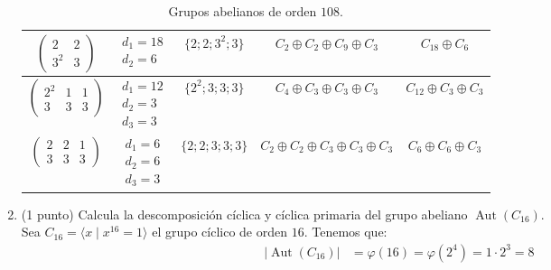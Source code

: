 \documentclass[12pt]{article}
\DeclareMathOperator{\Aut}{Aut}
\begin{document}
\begin{ejercicio}
\begin{enumerate}
\begin{table}[h]
\begin{tabular}{c|c|c|c|c}
                $\begin{pmatrix}
                    2 & 2\\
                    3^2 & 3
                \end{pmatrix}
                $ & $\begin{array}{l}
                    d_1=18 \\
                    d_2=6
                \end{array}$ & $\{2; 2; 3^2; 3\}$ & $C_2 \oplus C_2 \oplus C_9 \oplus C_3$ & $C_{18} \oplus C_6$ \\ \hline
                $\begin{pmatrix}
                    2^2 & 1 & 1\\
                    3 & 3 & 3
                \end{pmatrix}
                $ & $\begin{array}{l}
                    d_1=12 \\
                    d_2=3 \\
                    d_3=3
                \end{array}$ & $\{2^2; 3; 3; 3\}$ & $C_4 \oplus C_3 \oplus C_3 \oplus C_3$ & $C_{12} \oplus C_3 \oplus C_3$ \\ \hline
                $\begin{pmatrix}
                    2 & 2 & 1\\
                    3 & 3 & 3
                \end{pmatrix}
                $ & $\begin{array}{l}
                    d_1=6 \\
                    d_2=6 \\
                    d_3=3
                \end{array}$ & $\{2; 2; 3; 3; 3\}$ & $C_2 \oplus C_2 \oplus C_3 \oplus C_3 \oplus C_3$ & $C_6 \oplus C_6 \oplus C_3$
            \end{tabular}
            \caption{Grupos abelianos de orden $108$.}
            \label{tab:grupos_abelianos_108}
        \end{table}





            \item (1 punto) Calcula la descomposición cíclica y cíclica primaria del grupo abeliano $\Aut(C_{16})$.\\
            
            Sea $C_{16}=\langle x\mid x^{16}=1\rangle$ el grupo cíclico de orden $16$. Tenemos que:
            \begin{align*}
                |\Aut(C_{16})| & = \varphi(16) = \varphi(2^4) = 1\cdot 2^3=8
            \end{align*}


\end{enumerate}
\end{ejercicio}
\end{document}

